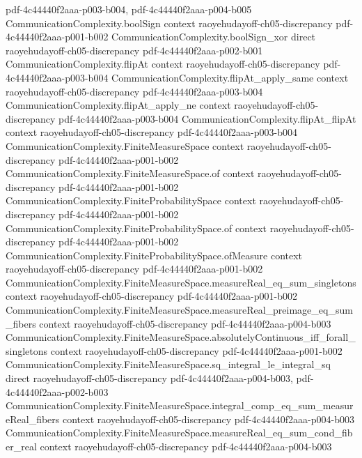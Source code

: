 \begin{lemma}
  {pdf-4c44440f2aaa-p003-b004,
    pdf-4c44440f2aaa-p004-b005}
\proofstep
  {CommunicationComplexity.boolSign}
  {context}
  {raoyehudayoff-ch05-discrepancy}
  {pdf-4c44440f2aaa-p001-b002}
\proofstep
  {CommunicationComplexity.boolSign_xor}
  {direct}
  {raoyehudayoff-ch05-discrepancy}
  {pdf-4c44440f2aaa-p002-b001}
\proofstep
  {CommunicationComplexity.flipAt}
  {context}
  {raoyehudayoff-ch05-discrepancy}
  {pdf-4c44440f2aaa-p003-b004}
\proofstep
  {CommunicationComplexity.flipAt_apply_same}
  {context}
  {raoyehudayoff-ch05-discrepancy}
  {pdf-4c44440f2aaa-p003-b004}
\proofstep
  {CommunicationComplexity.flipAt_apply_ne}
  {context}
  {raoyehudayoff-ch05-discrepancy}
  {pdf-4c44440f2aaa-p003-b004}
\proofstep
  {CommunicationComplexity.flipAt_flipAt}
  {context}
  {raoyehudayoff-ch05-discrepancy}
  {pdf-4c44440f2aaa-p003-b004}
\proofstep
  {CommunicationComplexity.FiniteMeasureSpace}
  {context}
  {raoyehudayoff-ch05-discrepancy}
  {pdf-4c44440f2aaa-p001-b002}
\proofstep
  {CommunicationComplexity.FiniteMeasureSpace.of}
  {context}
  {raoyehudayoff-ch05-discrepancy}
  {pdf-4c44440f2aaa-p001-b002}
\proofstep
  {CommunicationComplexity.FiniteProbabilitySpace}
  {context}
  {raoyehudayoff-ch05-discrepancy}
  {pdf-4c44440f2aaa-p001-b002}
\proofstep
  {CommunicationComplexity.FiniteProbabilitySpace.of}
  {context}
  {raoyehudayoff-ch05-discrepancy}
  {pdf-4c44440f2aaa-p001-b002}
\proofstep
  {CommunicationComplexity.FiniteProbabilitySpace.ofMeasure}
  {context}
  {raoyehudayoff-ch05-discrepancy}
  {pdf-4c44440f2aaa-p001-b002}
\proofstep
  {CommunicationComplexity.FiniteMeasureSpace.measureReal_eq_sum_singletons}
  {context}
  {raoyehudayoff-ch05-discrepancy}
  {pdf-4c44440f2aaa-p001-b002}
\proofstep
  {CommunicationComplexity.FiniteMeasureSpace.measureReal_preimage_eq_sum_fibers}
  {context}
  {raoyehudayoff-ch05-discrepancy}
  {pdf-4c44440f2aaa-p004-b003}
\proofstep
  {CommunicationComplexity.FiniteMeasureSpace.absolutelyContinuous_iff_forall_singletons}
  {context}
  {raoyehudayoff-ch05-discrepancy}
  {pdf-4c44440f2aaa-p001-b002}
\proofstep
  {CommunicationComplexity.FiniteMeasureSpace.sq_integral_le_integral_sq}
  {direct}
  {raoyehudayoff-ch05-discrepancy}
  {pdf-4c44440f2aaa-p004-b003,
    pdf-4c44440f2aaa-p002-b003}
\proofstep
  {CommunicationComplexity.FiniteMeasureSpace.integral_comp_eq_sum_measureReal_fibers}
  {context}
  {raoyehudayoff-ch05-discrepancy}
  {pdf-4c44440f2aaa-p004-b003}
\proofstep
  {CommunicationComplexity.FiniteMeasureSpace.measureReal_eq_sum_cond_fiber_real}
  {context}
  {raoyehudayoff-ch05-discrepancy}
  {pdf-4c44440f2aaa-p004-b003}

\end{lemma}
